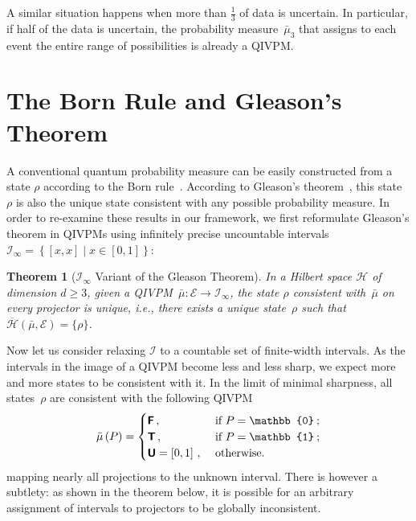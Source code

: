\documentclass[english,reprint, aps, prl,superscriptaddress, showpacs,
showkeys, longbibliography, amsmath, amssymb, floatfix]{revtex4-1}
\theoremstyle{plain}
\newtheorem{thm}{Theorem}
\theoremstyle{definition}
\newcommand{\Hilb}{\mathcal{H}}
\newcommand{\events}{\ensuremath{\mathcal{E}}}
\newcommand{\interval}[1]{{\normalfont\textsf{\textbf{#1}}}}
\newcommand{\imposs}{\interval{F}}
\newcommand{\necess}{\interval{T}}
\newcommand{\unknown}{\interval{U}}
\newcommand{\set}[2]{\ensuremath{\left\{ {#1}\mathrel{}\middle|\mathrel{}{#2}\right\} }}
\newcommand{\coreBorn}{\ensuremath{\overline{\Hilb}}}
\begin{document}
A similar situation happens when more than $\frac{1}{3}$ of data
is uncertain. In particular, if half of the data is uncertain, the probability
measure~$\bar{\mu}_{3}$ that assigns to each event the entire range of possibilities
is already a QIVPM.

\section{The Born Rule and Gleason's Theorem}

\label{sec:Gleason}

A conventional quantum probability measure can be easily constructed
from a state $\rho$ according to the Born
rule~\cite{Born1983bibTeX,Mermin2007,Jaeger2007}.  According
to Gleason's
theorem~\cite{gleason1957,Redhead1987-REDINA,peres1995quantum}, this
state $\rho$ is also the unique state consistent with any possible
probability measure. In order to re-examine these results in our
framework, we first reformulate Gleason's theorem in QIVPMs using
infinitely precise uncountable
intervals~$\mathscr{I}_{\infty}=\set{\left[x,x\right]}{x\in\left[0,1\right]}$:

\begin{thm}[$\mathscr{I}_{\infty}$ Variant of the Gleason
  Theorem]\label{cor:Gleason's}In
  a Hilbert space $\Hilb$ of dimension $d\geq3$, given a
  QIVPM~$\bar{\mu}:\events\rightarrow\mathscr{I}_{\infty}$, the state
  $\rho$ consistent with~$\bar{\mu}$ on every projector
  is unique, i.e., there exists a
  unique state~$\rho$ such that
  $\coreBorn\left(\bar{\mu},\events\right)=\{\rho\}$.
  \end{thm}

Now let us consider relaxing $\mathscr{I}$
to a countable set of finite-width intervals.
As the intervals in the image of a QIVPM become less and less sharp,
we expect more and more states to be consistent with it. In
the limit of minimal sharpness, all states~$\rho$
are consistent with the following QIVPM
\begin{equation}
\bar{\mu}\left(P\right)=\begin{cases}
\imposs\,, & \textrm{ if }P=\mathbb{0}\:;\\
\necess\,, & \textrm{ if }P=\mathbb{1}\:;\\
\unknown=\left[0,1\right]\,, & \textrm{ otherwise.}
\end{cases}
\end{equation}
mapping nearly all
projections to the unknown interval. There is however a subtlety: as shown in the
theorem below, it is possible for an arbitrary assignment of intervals to projectors
to be globally inconsistent.
\end{document}
